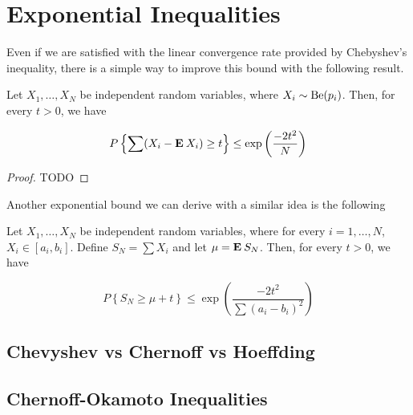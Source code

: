 \chapter{Exponential Inequalities}

Even if we are satisfied with the linear convergence rate provided by Chebyshev's inequality, there is a simple way to improve this bound with the following result.

\begin{theorem}\label{hoeffding:bernoulli}
  Let $X_1, \ldots, X_N$ be independent random variables, where $X_i \sim \mathrm{Be}(p_i)$. Then, for every $t > 0$, we have
  
  \[ P\left\{ \sum (X_i - \mathbf{E}\: X_i) \geq t\right\} \leq \exp\left( \frac{-2t^2}{N}\right) \] 
\end{theorem}

\begin{proof}
  TODO
\end{proof}

Another exponential bound we can derive with a similar idea is the following

\begin{theorem}\label{chernoff:bernoulli}
  Let $X_1, \ldots, X_N$ be independent random variables, where for every $i = 1,\ldots,N$, $X_i \in [a_i,b_i]$. Define $S_N = \sum X_i$ and let $\mu = \mathbf{E}\: S_N$. Then, for every $t > 0$, we have
  
  \[ P\left\{  S_N \geq \mu + t\right\} \leq \exp\left( \frac{-2t^2}{\sum{( a_i - b_i )}^2}\right) \] 
\end{theorem}

\section{Chevyshev vs Chernoff vs Hoeffding}

\section{Chernoff-Okamoto Inequalities}


